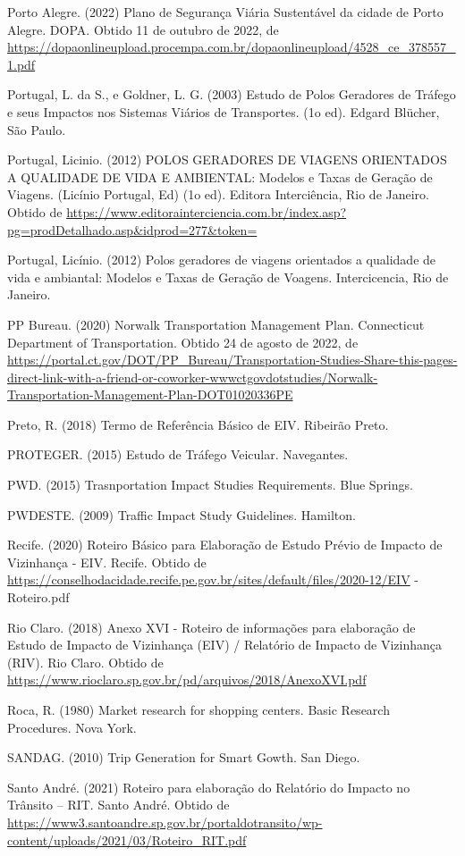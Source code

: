 \documentclass[]{article}
\begin{document}
Porto Alegre. (2022) Plano de Segurança Viária Sustentável da cidade de
Porto Alegre. DOPA. Obtido 11 de outubro de 2022, de
\url{https://dopaonlineupload.procempa.com.br/dopaonlineupload/4528_ce_378557_1.pdf}

Portugal, L. da S., e Goldner, L. G. (2003) Estudo de Polos Geradores de
Tráfego e seus Impactos nos Sistemas Viários de Transportes. (1o ed).
Edgard Blücher, São Paulo.

Portugal, Licinio. (2012) POLOS GERADORES DE VIAGENS ORIENTADOS A
QUALIDADE DE VIDA E AMBIENTAL: Modelos e Taxas de Geração de Viagens.
(Licínio Portugal, Ed) (1o ed). Editora Interciência, Rio de Janeiro.
Obtido de
\url{https://www.editorainterciencia.com.br/index.asp?pg=prodDetalhado.asp\&idprod=277\&token=}

Portugal, Licínio. (2012) Polos geradores de viagens orientados a
qualidade de vida e ambiantal: Modelos e Taxas de Geração de Voagens.
Intercicencia, Rio de Janeiro.

PP Bureau. (2020) Norwalk Transportation Management Plan. Connecticut
Department of Transportation. Obtido 24 de agosto de 2022, de
\url{https://portal.ct.gov/DOT/PP_Bureau/Transportation-Studies-Share-this-pages-direct-link-with-a-friend-or-coworker-wwwctgovdotstudies/Norwalk-Transportation-Management-Plan-DOT01020336PE}

Preto, R. (2018) Termo de Referência Básico de EIV. Ribeirão Preto.

PROTEGER. (2015) Estudo de Tráfego Veicular. Navegantes.

PWD. (2015) Trasnportation Impact Studies Requirements. Blue Springs.

PWDESTE. (2009) Traffic Impact Study Guidelines. Hamilton.

Recife. (2020) Roteiro Básico para Elaboração de Estudo Prévio de
Impacto de Vizinhança - EIV. Recife. Obtido de
\url{https://conselhodacidade.recife.pe.gov.br/sites/default/files/2020-12/EIV}
- Roteiro.pdf

Rio Claro. (2018) Anexo XVI - Roteiro de informações para elaboração de
Estudo de Impacto de Vizinhança (EIV) / Relatório de Impacto de
Vizinhança (RIV). Rio Claro. Obtido de
\url{https://www.rioclaro.sp.gov.br/pd/arquivos/2018/AnexoXVI.pdf}

Roca, R. (1980) Market research for shopping centers. Basic Research
Procedures. Nova York.

SANDAG. (2010) Trip Generation for Smart Gowth. San Diego.

Santo André. (2021) Roteiro para elaboração do Relatório do Impacto no
Trânsito -- RIT. Santo André. Obtido de
\url{https://www3.santoandre.sp.gov.br/portaldotransito/wp-content/uploads/2021/03/Roteiro_RIT.pdf}
\end{document}
